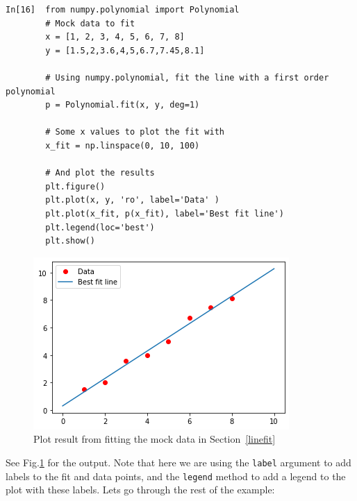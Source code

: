 \begin{lstlisting}[style=PY]
  In[16]  from numpy.polynomial import Polynomial
        # Mock data to fit
        x = [1, 2, 3, 4, 5, 6, 7, 8] 
        y = [1.5,2,3.6,4,5,6.7,7.45,8.1]
        
        # Using numpy.polynomial, fit the line with a first order polynomial
        p = Polynomial.fit(x, y, deg=1)
        
        # Some x values to plot the fit with
        x_fit = np.linspace(0, 10, 100)
        
        # And plot the results
        plt.figure()
        plt.plot(x, y, 'ro', label='Data' )
        plt.plot(x_fit, p(x_fit), label='Best fit line') 
        plt.legend(loc='best') 
        plt.show()
\end{lstlisting}

\begin{figure}[H]
	\centering
	\includegraphics[scale=0.75]{Pictures/linefit.png}
\caption{Plot result from fitting the mock data in Section~\ref{linefit}}
\label{fig:bf1}
\end{figure}

See Fig.\ref{fig:bf1} for the output. Note that here we are using the {\tt label} argument to add labels to the fit and data points, and the \texttt{legend} method to add a legend to the plot with these labels. Lets go through the rest of the example:

